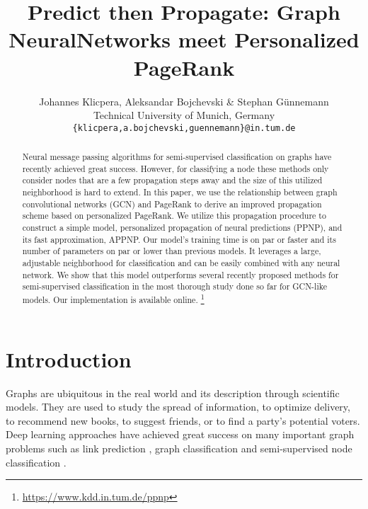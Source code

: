 \documentclass{article} \usepackage{iclr2019_conference,times}
\title{Predict then Propagate: Graph Neural\newline Networks meet Personalized PageRank}
\author{Johannes Klicpera, Aleksandar Bojchevski \& Stephan Günnemann\\
Technical University of Munich, Germany\\
\texttt{\{klicpera,a.bojchevski,guennemann\}@in.tum.de}
}
\begin{document}
\maketitle

\begin{abstract}
    Neural message passing algorithms for semi-supervised classification on graphs have recently achieved great success. However, for classifying a node these methods only consider nodes that are a few propagation steps away and the size of this utilized neighborhood is hard to extend. In this paper, we use the relationship between graph convolutional networks (GCN) and PageRank to derive an improved propagation scheme based on personalized PageRank. We utilize this propagation procedure to construct a simple model, personalized propagation of neural predictions (PPNP), and its fast approximation, APPNP. Our model's training time is on par or faster and its number of parameters on par or lower than previous models. It leverages a large, adjustable neighborhood for classification and can be easily combined with any neural network. We show that this model outperforms several recently proposed methods for semi-supervised classification in the most thorough study done so far for GCN-like models. Our implementation is available online. \footnote{\url{https://www.kdd.in.tum.de/ppnp}}
\end{abstract}



\section{Introduction}

Graphs are ubiquitous in the real world and its description through scientific models. They are used to study the spread of information, to optimize delivery, to recommend new books, to suggest friends, or to find a party’s potential voters.
Deep learning approaches have achieved great success on many important graph problems such as link prediction \citep{grover_node2vec:_2016,bojchevski_netgan:_2018}, graph classification \citep{duvenaud_convolutional_2015,niepert_learning_2016,gilmer_neural_2017} and semi-supervised node classification \citep{yang_revisiting_2016,kipf_semi-supervised_2017}.
\end{document}
